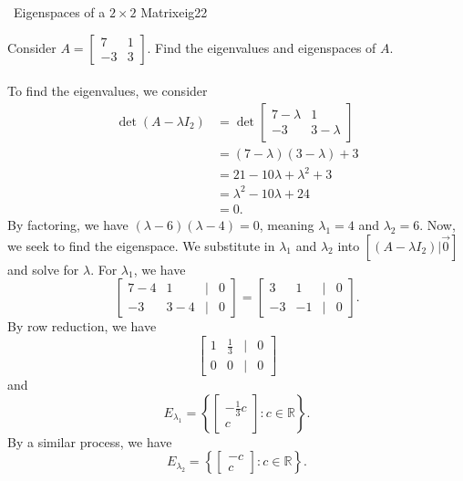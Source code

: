         \begin{example}{\Difficulty\,\Difficulty\,\,Eigenspaces of a \(2\times 2\) Matrix}{eig22}
            
            Consider \(A=\begin{bmatrix} 7 & 1 \\ -3 & 3 \end{bmatrix}\). Find the eigenvalues and eigenspaces of \(A\).
            \\
            \\
            To find the eigenvalues, we consider
            \begin{align*}
                \det(A-\lambda I_2)&=\det \begin{bmatrix} 7-\lambda & 1 \\ -3 & 3-\lambda \end{bmatrix} \\
                &=(7-\lambda)(3-\lambda)+3 \\
                &=21-10\lambda+\lambda^2+3 \\
                &=\lambda^2-10\lambda+24 \\
                &=0.
            \end{align*}
            By factoring, we have \((\lambda-6)(\lambda-4)=0\), meaning \(\lambda_1=4\) and \(\lambda_2=6\). Now, we seek to find the eigenspace. We substitute in \(\lambda_1\) and \(\lambda_2\) into \([(A-\lambda I_2)|\vec{0}]\) and solve for \(\lambda\). For \(\lambda_1\), we have
            \begin{equation*}
                \begin{bmatrix} 7-4 & 1 & | & 0 \\ -3 & 3-4 & | & 0 \end{bmatrix}=\begin{bmatrix} 3 & 1 & | & 0 \\ -3 & -1 & | & 0 \end{bmatrix}.
            \end{equation*}
            By row reduction, we have
            \begin{equation*}
                \begin{bmatrix} 1 & \frac{1}{3} & | & 0 \\ 0 & 0 & | & 0 \end{bmatrix}
            \end{equation*}
            and
            \begin{equation*}
                E_{\lambda_1}=\left\{\begin{bmatrix} -\frac{1}{3}c \\ c \end{bmatrix}: c\in\mathbb{R}\right\}.
            \end{equation*}
            By a similar process, we have
            \begin{equation*}
                E_{\lambda_2}=\left\{\begin{bmatrix} -c \\ c \end{bmatrix}: c\in\mathbb{R}\right\}.
            \end{equation*}

        \end{example}
